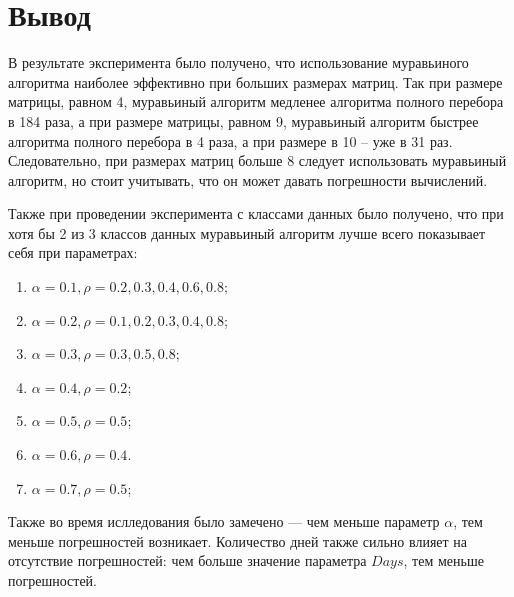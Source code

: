 \section*{Вывод}

В результате эксперимента было получено, что использование муравьиного алгоритма наиболее эффективно при больших размерах матриц. Так при размере матрицы, равном 4, муравьиный алгоритм медленее алгоритма полного перебора в 184 раза, а при размере матрицы, равном 9, муравьиный алгоритм быстрее алгоритма полного перебора в 4 раза, а при размере в 10 -- уже в 31 раз. Следовательно, при размерах матриц больше 8 следует использовать муравьиный алгоритм, но стоит учитывать, что он может давать погрешности вычислений.

Также при проведении эксперимента с классами данных было получено, что при хотя бы 2 из 3 классов данных муравьиный алгоритм лучше всего показывает себя при параметрах:
\begin{enumerate}[label=\arabic*)]
    \item $\alpha = 0.1, \rho = 0.2, 0.3, 0.4, 0.6, 0.8$;
    \item $\alpha = 0.2, \rho = 0.1, 0.2, 0.3, 0.4, 0.8$;
    \item $\alpha = 0.3, \rho = 0.3, 0.5, 0.8$;
    \item $\alpha = 0.4, \rho = 0.2$;
    \item $\alpha = 0.5, \rho = 0.5$;
    \item $\alpha = 0.6, \rho = 0.4$.
    \item $\alpha = 0.7, \rho = 0.5$;
\end{enumerate}  

Также во время ислледования было замечено --- чем меньше параметр $\alpha$, тем меньше погрешностей возникает. Количество дней также сильно влияет на отсутствие погрешностей: чем больше значение параметра $Days$, тем меньше погрешностей.